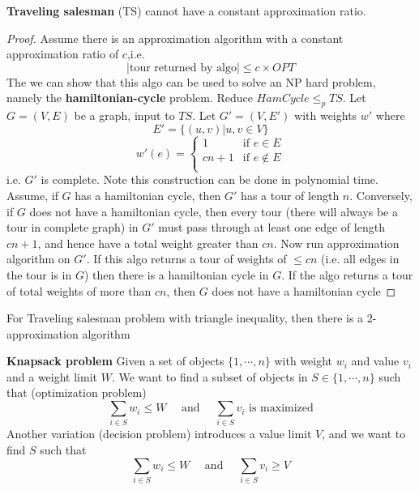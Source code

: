 \documentclass[11pt]{article}
\begin{document}
\begin{theorem*}
    \textbf{Traveling salesman} (TS) cannot have a constant approximation ratio. 
    \begin{proof}
        Assume there is an approximation algorithm with a constant approximation ratio of $c$,i.e. 
        \[
            |\text{tour returned by algo}| \leq c\times OPT
        \]
        The we can show that this algo can be used to solve an NP hard problem, namely the \textbf{hamiltonian-cycle} problem. Reduce $HamCycle \leq_p TS$. Let $G = (V,E)$ be a graph, input to $TS$. Let $G' = (V, E')$ with weights $w'$ where 
        \[
            E' = \{ (u,v) | u,v\in V \}
        \] 
        \[
            w'(e) = 
            \begin{cases}
                1 & \text{if } e\in E\\
                cn + 1 & \text{if } e\not\in E\\
            \end{cases}
        \]
        i.e. $G'$ is complete. Note this construction can be done in polynomial time. Assume, if $G$ has a hamiltonian cycle, then $G'$ has a tour of length $n$. Conversely, if $G$ does not have a hamiltonian cycle, then every tour (there will always be a tour in complete graph) in $G'$ must pass through at least one edge of length $cn+1$, and hence have a total weight greater than $cn$. Now run approximation algorithm on $G'$. If this algo returns a tour of weights of $\leq cn$ (i.e. all edges in the tour is in $G$) then there is a hamiltonian cycle in $G$. If the algo returns a tour of total weights of more than $cn$, then $G$ does not have a hamiltonian cycle
    \end{proof}
\end{theorem*}


\begin{defn*}
    For Traveling salesman problem with triangle inequality, then there is a 2-approximation algorithm
\end{defn*}


\begin{defn*}
    \textbf{Knapsack problem} Given a set of objects $\{1,\cdots, n \}$ with weight $w_i$ and value $v_i$ and a weight limit $W$. We want to find a subset of objects in $S \in \{1,\cdots, n\}$ such that (optimization problem)
    \[
        \sum_{i\in S} w_i \leq W \quad \text{ and } \quad \sum_{i\in S} v_i \text{ is maximized}
    \]
    Another variation (decision problem) introduces a value limit $V$, and we want to find $S$ such that 
    \[
        \sum_{i\in S} w_i \leq W \quad \text{ and } \quad \sum_{i\in S} v_i \geq V
    \]
\end{defn*}
\end{document}
